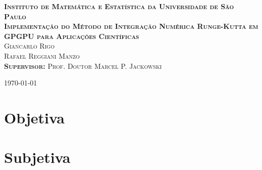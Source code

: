 \documentclass[brazil,a4paper,11pt]{book}
\begin{document}
\begin{titlepage}
  \begin{center}
  \textsc{{\small \textbf{Instituto de Matemática e Estatística da Universidade de São Paulo}}}
  \\[6cm]
  \textsc{{\large \textbf{Implementação do Método de Integração Numérica Runge-Kutta em GPGPU para Aplicações Científicas}}}
  \\[2cm]
  \textsc{Giancarlo Rigo\\
          Rafael Reggiani Manzo\\
          \textbf{Supervisor:} Prof. Doutor Marcel P. Jackowski}
  
  \vfill
  \today
  \end{center}
\end{titlepage}

\tableofcontents

\part{Objetiva}







\part{Subjetiva}


\end{document}
